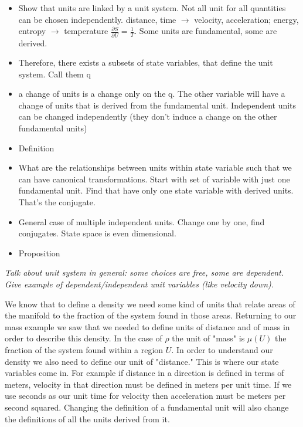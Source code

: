 \documentclass{article}
\begin{document}
\begin{itemize}
	\item Show that units are linked by a unit system. Not all unit for all quantities can be chosen independently. distance, time $\to$ velocity, acceleration; energy, entropy $\to$ temperature $\frac{\partial{S}}{\partial U} = \frac{1}{T}$. Some units are fundamental, some are derived.
	
	\item Therefore, there exists a subsets of state variables, that define the unit system. Call them q
	
	\item a change of units is a change only on the q.  The other variable will have a change of units that is derived from the fundamental unit. Independent units can be changed independently (they don't induce a change on the other fundamental units)
	
	\item Definition
	
	\item What are the relationships between units within state variable such that we can have canonical transformations. Start with set of variable with just one fundamental unit. Find that have only one state variable with derived units. That's the conjugate.
	
	\item General case of multiple independent units. Change one by one, find conjugates. State space is even dimensional.
	
	\item Proposition
	
\end{itemize}

\emph{Talk about unit system in general: some choices are free, some are dependent. Give example of dependent/independent unit variables (like velocity down).}

	We know that to define a density we need some kind of units that relate areas of the manifold to the fraction of the system found in those areas. Returning to our mass example we saw that we needed to define units of distance and of mass in order to describe this density. In the case of $\rho$ the unit of "mass" is $\mu(U)$ the fraction of the system found within a region $U$. In order to understand our density we also need to define our unit of "distance." This is where our state variables come in. For example if distance in a direction is defined in terms of meters, velocity in that direction must be defined in meters per unit time. If we use seconds as our unit time for velocity then acceleration must be meters per second squared. Changing the definition of a fundamental unit will also change the definitions of all the units derived from it. 
	
\end{document}
